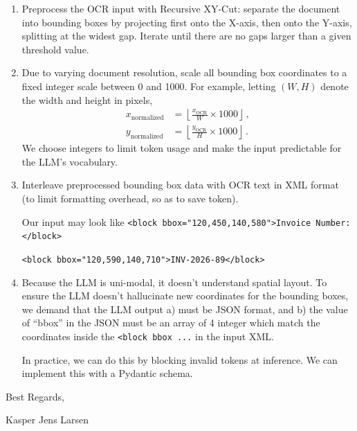 \documentclass[11pt,a4paper]{article}
\numberwithin{equation}{section}
\begin{document}
\begin{enumerate}

\item Preprocess the OCR input with Recursive XY-Cut: separate the document
into bounding boxes by projecting first onto the X-axis, then onto the Y-axis,
splitting at the widest gap. Iterate until there are no gaps larger than a given threshold value.

\item Due to varying document resolution, scale all bounding box coordinates to
a fixed integer scale between 0 and 1000. For example, letting $(W, H)$ denote the width and height in pixels,
\begin{align}
x_\mathrm{normalized} &= \left\lfloor \frac{x_\mathrm{OCR}}{W} \times 1000 \right\rfloor \,, \\[2mm]
y_\mathrm{normalized} &= \left\lfloor \frac{y_\mathrm{OCR}}{H} \times 1000 \right\rfloor \,.
\end{align}
We choose integers to limit token usage and make the input predictable for the LLM's
vocabulary.

\item Interleave preprocessed bounding box data with OCR text in XML format
(to limit formatting overhead, so as to save token).

Our input may look like
\texttt{<block bbox="120,450,140,580">Invoice Number:</block>}

\texttt{<block bbox="120,590,140,710">INV-2026-89</block>}


\item Because the LLM is uni-modal, it doesn't understand spatial layout.
To ensure the LLM doesn't hallucinate new coordinates for the bounding boxes,
we demand that the LLM output a) must be JSON format, and b) the value of ``bbox''
in the JSON must be an array of 4 integer which match the coordinates inside
the \texttt{<block bbox ...} in the input XML.

In practice, we can do this by blocking invalid tokens at inference. We can
implement this with a Pydantic schema.



\end{enumerate}


\vspace{8mm}

\noindent Best Regards,

\noindent Kasper Jens Larsen
\end{document}
